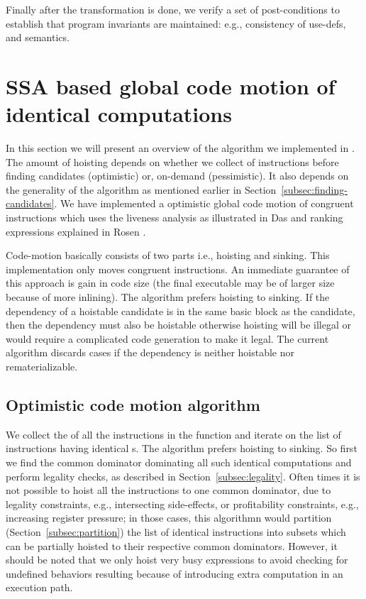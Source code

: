 \documentclass[acmlarge,review]{acmart}\settopmatter{printfolios=true}
\begin{document}
Finally after the transformation is done, we verify a set of post-conditions to
establish that program invariants are maintained: e.g., consistency of use-defs,
and \SSA{} semantics.

\section{SSA based global code motion of identical computations}
\label{sec:implementation-details}
In this section we will present an overview of the algorithm we implemented in
\LLVM{}.  The amount of hoisting depends on whether we collect \GVN{} of
instructions before finding candidates (optimistic) or, on-demand
(pessimistic). It also depends on the generality of the \GVN{} algorithm as
mentioned earlier in Section~\ref{subsec:finding-candidates}. We have
implemented a optimistic global code motion of congruent instructions which uses
the liveness analysis as illustrated in Das \cite{das2012} and ranking
expressions explained in Rosen \cite{rosen1988global}.

Code-motion basically consists of two parts i.e., hoisting and sinking. This
implementation only moves congruent instructions. An immediate guarantee of this
approach is gain in code size (the final executable may be of larger size
because of more inlining). The algorithm prefers hoisting to sinking. If the
dependency of a hoistable candidate is in the same basic block as the candidate,
then the dependency must also be hoistable otherwise hoisting will be illegal or
would require a complicated code generation to make it legal. The current
algorithm discards cases if the dependency is neither hoistable nor
rematerializable.

\subsection{Optimistic code motion algorithm}
\label{subsec:optimistic}
We collect the \GVN{} of all the instructions in the function and iterate on the
list of instructions having identical \GVN{}s. The algorithm prefers hoisting to
sinking. So first we find the common dominator dominating all such identical
computations and perform legality checks, as described in
Section~\ref{subsec:legality}. Often times it is not possible to hoist all the
instructions to one common dominator, due to legality constraints, e.g.,
intersecting side-effects, or profitability constraints, e.g., increasing
register pressure; in those cases, this algorithmn would partition
(Section~\ref{subsec:partition}) the list of identical instructions into subsets
which can be partially hoisted to their respective common dominators. However,
it should be noted that we only hoist very busy expressions to avoid checking
for undefined behaviors resulting because of introducing extra computation in an
execution path.
\end{document}
